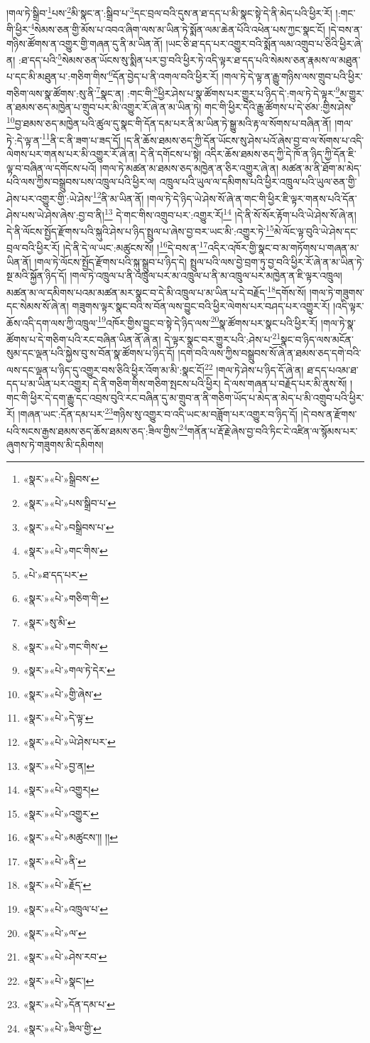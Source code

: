 །གལ་ཏེ་སྒྲིབ་\footnote{«སྣར་»«པེ་»སྒྲིབས་}པས་\footnote{«སྣར་»«པེ་»པས་སྒྲིབ་པ་}མི་སྣང་ན་:སྒྲིབ་པ་\footnote{«སྣར་»«པེ་»བསྒྲིབས་པ་}དང་བྲལ་བའི་དུས་ན་ཐ་དད་པ་མི་སྣང་སྟེ་དེ་ནི་མེད་པའི་ཕྱིར་རོ། །:གང་གི་ཕྱིར་\footnote{«སྣར་»«པེ་»གང་གིས་}སེམས་ཅན་གྱི་མོས་པ་འབའ་ཞིག་ལས་མ་ཡིན་ཏེ་སྨོན་ལམ་ཆེན་པོའི་འཕེན་པས་ཀྱང་སྣང་ངོ། །དེ་བས་ན་གཉིས་ཚོགས་ན་འགྱུར་གྱི་གཞན་དུ་ནི་མ་ཡིན་ནོ། །ཡང་ཅི་ཐ་དད་པར་འགྱུར་བའི་སྨོན་ལམ་འགྲུབ་པ་ཅིའི་ཕྱིར་ཞེ་ན། :ཐ་དད་པའི་\footnote{«པེ་»ཐ་དད་པར་}སེམས་ཅན་ཡོངས་སུ་སྨིན་པར་བྱ་བའི་ཕྱིར་ཏེ་འདི་ལྟར་ཐ་དད་པའི་སེམས་ཅན་རྣམས་ལ་མཐུན་པ་དང་མི་མཐུན་པ་:གཅིག་གིས་\footnote{«སྣར་»«པེ་»གཅིག་གི་}དོན་བྱེད་པ་ནི་འགལ་བའི་ཕྱིར་རོ། །གལ་ཏེ་དེ་ལྟ་ན་རྒྱུ་གཉིས་ལས་གྲུབ་པའི་ཕྱིར་གཅིག་ལས་སྣ་ཚོགས་:སུ་ནི་\footnote{«སྣར་»སུ་མི་}སྣང་ན། :གང་གི་\footnote{«སྣར་»«པེ་»གང་གིས་}ཕྱིར་ཤེས་པ་སྣ་ཚོགས་པར་གྱུར་པ་ཉིད་དེ་:གལ་ཏེ་དེ་ལྟར་\footnote{«སྣར་»«པེ་»གལ་ཏེ་དེར་}མ་གྱུར་ན་ཐམས་ཅད་མཁྱེན་པ་གྲུབ་པར་མི་འགྱུར་རོ་ཞེ་ན་མ་ཡིན་ཏེ། གང་གི་ཕྱིར་དེའི་རྒྱུ་ཚོགས་པ་དེ་ཙམ་:གྱིས་ཤེས་\footnote{«སྣར་»«པེ་»གྱི་ཞེས་}བྱ་ཐམས་ཅད་མཁྱེན་པའི་ཚུལ་དུ་སྣང་གི་དོན་དམ་པར་ནི་མ་ཡིན་ཏེ་སྒྱུ་མའི་རྟ་ལ་སོགས་པ་བཞིན་ནོ། །གལ་ཏེ་:དེ་ལྟ་ན་\footnote{«སྣར་»«པེ་»དེ་ལྟ་}ནི་ང་ནི་ཟག་པ་ཟད་དོ། །ད་ནི་ཆོས་ཐམས་ཅད་ཀྱི་དོན་ཡོངས་སུ་ཤེས་པའོ་ཞེས་བྱ་བ་ལ་སོགས་པ་འདི་ལེགས་པར་གནས་པར་མི་འགྱུར་རོ་ཞེ་ན། དེ་ནི་དགོངས་པ་སྟེ། འདིར་ཆོས་ཐམས་ཅད་ཀྱི་དེ་ཁོ་ན་ཉིད་ཀྱི་དོན་ཇི་ལྟ་བ་བཞིན་ལ་དགོངས་པའོ། །གལ་ཏེ་མཚན་མ་ཐམས་ཅད་མཁྱེན་ན་ཅིར་འགྱུར་ཞེ་ན། མཚན་མ་ནི་ཐོག་མ་མེད་པའི་ལས་ཀྱིས་བསྒྲུབས་པས་འཁྲུལ་པའི་ཕྱིར་ལ། འཁྲུལ་པའི་ཡུལ་ལ་དམིགས་པའི་ཕྱིར་འཁྲུལ་པའི་ཡུལ་ཅན་གྱི་ཤེས་པར་འགྱུར་གྱི་:ཡེ་ཤེས་\footnote{«སྣར་»«པེ་»ཡེ་ཤེས་པར་}ནི་མ་ཡིན་ནོ། །གལ་ཏེ་དེ་ཉིད་ཡེ་ཤེས་སོ་ཞེ་ན་གང་གི་ཕྱིར་ཇི་ལྟར་གནས་པའི་དོན་ཤེས་པས་ཡེ་ཤེས་ཞེས་:བྱ་བ་ནི།\footnote{«སྣར་»«པེ་»བྱ་ན།} དེ་གང་གིས་འགྲུབ་པར་:འགྱུར་རོ།\footnote{«སྣར་»«པེ་»འགྱུར།} །དེ་ནི་སོ་སོར་རྟོག་པའི་ཡེ་ཤེས་སོ་ཞེ་ན། དེ་ནི་ལོངས་སྤྱོད་རྫོགས་པའི་སྐུའི་ཤེས་པ་ཉིད་སྤྲུལ་པ་ཞེས་བྱ་བར་ཡང་མི་:འགྱུར་ཏེ་\footnote{«སྣར་»«པེ་»འགྱུར་}མེ་ལོང་ལྟ་བུའི་ཡེ་ཤེས་དང་བྲལ་བའི་ཕྱིར་རོ། །དེ་ནི་དེ་ལ་ཡང་:མཚུངས་སོ། །\footnote{«སྣར་»«པེ་»མཚུངས་།། །།}དེ་བས་ན་\footnote{«སྣར་»«པེ་»ནི་}འདིར་འཁོར་གྱི་སྣང་བ་མ་གཏོགས་པ་གཞན་མ་ཡིན་ནོ། །གལ་ཏེ་ལོངས་སྤྱོད་རྫོགས་པའི་སྐུ་སྒྲུབ་པ་ཉིད་དེ། སྤྲུལ་པའི་ལས་བྱེ་བྲག་ཏུ་བྱ་བའི་ཕྱིར་རོ་ཞེ་ན་མ་ཡིན་ཏེ་སྔ་མའི་སྐྱོན་ཉིད་དོ། །གལ་ཏེ་འཁྲུལ་པ་ནི་འཁྲུལ་པར་མ་འཁྲུལ་པ་ནི་མ་འཁྲུལ་པར་མཁྱེན་ན་ཇི་ལྟར་འཁྲུལ། མཚན་མ་ལ་དམིགས་པའམ་མཚན་མར་སྣང་བ་དེ་མི་འཁྲུལ་པ་མ་ཡིན་པ་དེ་བརྗོད་\footnote{«སྣར་»«པེ་»རྗོད་}དགོས་སོ། །གལ་ཏེ་གཟུགས་དང་སེམས་སོ་ཞེ་ན། གཟུགས་ལྟར་སྣང་བའི་ས་བོན་ལས་བྱུང་བའི་ཕྱིར་ལེགས་པར་བཤད་པར་འགྱུར་རོ། །འདི་ལྟར་ཆོས་འདི་དག་ལས་ཀྱི་འཁྲུལ་\footnote{«སྣར་»«པེ་»འཁྲུལ་པ་}འཁོར་གྱིས་བྱུང་བ་སྟེ་དེ་ཉིད་ལས་\footnote{«སྣར་»«པེ་»ལ་}སྣ་ཚོགས་པར་སྣང་པའི་ཕྱིར་རོ། །གལ་ཏེ་སྣ་ཚོགས་པ་དེ་གཅིག་པའི་རང་བཞིན་ཡིན་ནོ་ཞེ་ན། དེ་ལྟར་སྣང་བར་གྱུར་པའི་:ཤེས་པ་\footnote{«སྣར་»«པེ་»ཤེས་རབ་}སྣང་བ་ཉིད་ལས་མངོན་སུམ་དང་ལྡན་པའི་སྐྱེས་བུ་ས་བོན་སྣ་ཚོགས་པ་ཉིད་དོ། །དགེ་བའི་ལས་ཀྱིས་བསྒྲུབས་སོ་ཞེ་ན་ཐམས་ཅད་དགེ་བའི་ལས་དང་ལྡན་པ་ཉིད་དུ་འགྱུར་བས་ཅིའི་ཕྱིར་འོག་མ་མི་:སྣང་ངོ།\footnote{«སྣར་»«པེ་»སྣང་།} །གལ་ཏེ་ཤེས་པ་ཉིད་དོ་ཞེ་ན། ཐ་དད་པའམ་ཐ་དད་པ་མ་ཡིན་པར་འགྱུར། དེ་ནི་གཅིག་གིས་གཅིག་སྤངས་པའི་ཕྱིར། དེ་ལས་གཞན་པ་བརྗོད་པར་མི་ནུས་སོ། །གང་གི་ཕྱིར་དེ་དག་རྒྱུ་དང་འབྲས་བུའི་རང་བཞིན་དུ་མ་གྲུབ་ན་ནི་གཅིག་ཡོད་པ་མེད་ན་མེད་པ་མི་འགྲུབ་པའི་ཕྱིར་རོ། །གཞན་ཡང་:དོན་དམ་པར་\footnote{«སྣར་»«པེ་»དོན་དམ་པ་}གཉིས་སུ་འགྱུར་བ་འདི་ཡང་མ་བཟློག་པར་འགྱུར་བ་ཉིད་དོ། །དེ་བས་ན་རྫོགས་པའི་སངས་རྒྱས་ཐམས་ཅད་ཆོས་ཐམས་ཅད་:ཟིལ་གྱིས་\footnote{«སྣར་»«པེ་»ཟིལ་གྱི་}གནོན་པ་རྡོ་རྗེ་ཞེས་བྱ་བའི་ཏིང་ངེ་འཛིན་ལ་སྙོམས་པར་ཞུགས་ཏེ་གཟུགས་མི་དམིགས། 